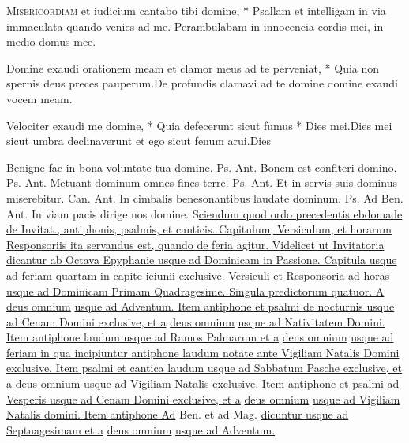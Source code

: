 \begin{multicols*}{2}
\lettrine[lines=2]{\zallmancaps \color{Red} M}{isericordiam} \hypertarget{misericordiam-et-iudicium}{\label{misericordiam-et-iudicium}} et iudicium cantabo tibi domine, * Psallam et intelligam in via immaculata quando venies ad me. \V Perambulabam in innocencia cordis mei, in medio domus mee.
\begin{responsory}
{Domine exaudi orationem meam et clamor meus ad te perveniat, * Quia non spernis deus preces pauperum.}{De profundis clamavi ad te domine domine exaudi vocem meam.}
\end{responsory}
\begin{responsory-final}
{Velociter exaudi me domine, * Quia defecerunt sicut fumus * Dies mei.}{Dies mei sicut umbra declinaverunt et ego sicut fenum arui.}{Dies}
\end{responsory-final}
 Benigne fac in bona voluntate tua domine. {\color{Red} Ps.}  {\color{Red} Ant.} Bonem est confiteri domino. {\color{Red} Ps.}  {\color{Red} Ant.} Metuant dominum omnes fines terre. {\color{Red} Ps.}  {\color{Red} Ant.} Et in servis suis dominus miserebitur. {\color{Red} Can.}  {\color{Red} Ant.} In cimbalis benesonantibus laudate dominum. {\color{Red} Ps.}  {\color{Red} Ad Ben. Ant.} In viam pacis dirige nos domine.
\lettrine[lines=2]{\zallmancaps \color{Blue} S}{}\ul{ciendum quod ordo precedentis ebdomade de Invitat., antiphonis, psalmis, et canticis. Capitulum, Versiculum, et horarum Responsoriis ita servandus est, quando de feria agitur. Videlicet ut Invitatoria dicantur ab Octava Epyphanie usque ad Dominicam in Passione. Capitula usque ad feriam quartam in capite ieiunii exclusive. Versiculi et Responsoria ad horas usque ad Dominicam Primam Quadragesime. Singula predictorum quatuor. A} \hyperlink{deus-omnium}{deus omnium} \ul{usque ad Adventum. Item antiphone et psalmi de nocturnis usque ad Cenam Domini exclusive, et a} \hyperlink{deus-omnium}{deus omnium} \ul{usque ad Nativitatem Domini. Item antiphone laudum usque ad Ramos Palmarum et a} \hyperlink{deus-omnium}{deus omnium} \ul{usque ad feriam in qua incipiuntur antiphone laudum notate ante Vigiliam Natalis Domini exclusive. Item psalmi et cantica laudum usque ad Sabbatum Pasche exclusive, et a} \hyperlink{deus-omnium}{deus omnium} \ul{usque ad Vigiliam Natalis exclusive. Item antiphone et psalmi ad Vesperis usque ad Cenam Domini exclusive, et a} \hyperlink{deus-omnium}{deus omnium} \ul{usque ad Vigiliam Natalis domini. Item antiphone Ad} Ben. et ad Mag. \ul{dicuntur usque ad Septuagesimam et a} \hyperlink{deus-omnium}{deus omnium} \ul{usque ad Adventum.}

\end{multicols*}
